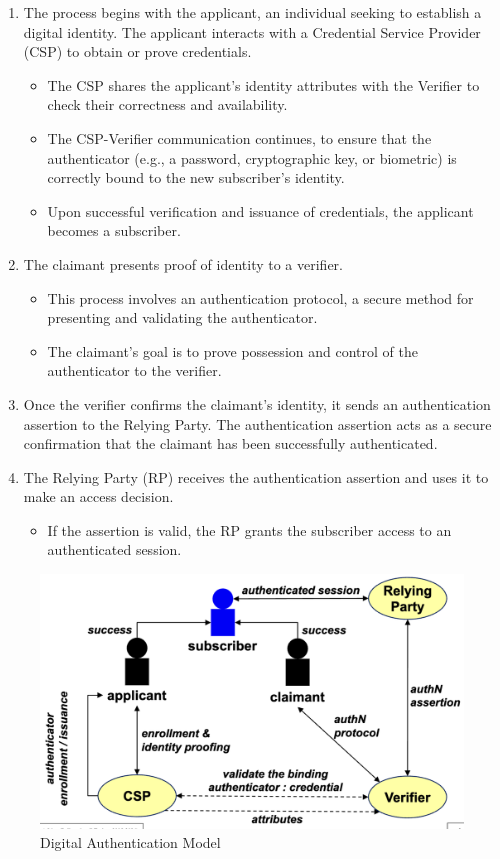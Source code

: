 \begin{enumerate}
    \item The process begins with the applicant, an individual seeking to establish a digital identity. The applicant interacts with a Credential Service Provider (CSP) to obtain or prove credentials.
\begin{itemize}
\item The CSP shares the applicant’s identity attributes with the Verifier to check their correctness and availability.
\item The CSP-Verifier communication continues, to ensure that the authenticator (e.g., a password, cryptographic key, or biometric) is correctly bound to the new subscriber’s identity.
\item Upon successful verification and issuance of credentials, the applicant becomes a subscriber.
\end{itemize}
    \item The claimant presents proof of identity to a verifier.
        \begin{itemize}
        \item This process involves an authentication protocol, a secure method for presenting and validating the authenticator.
        \item The claimant’s goal is to prove possession and control of the authenticator to the verifier.
        \end{itemize}
    \item Once the verifier confirms the claimant’s identity, it sends an authentication assertion to the Relying Party. The authentication assertion acts as a secure confirmation that the claimant has been successfully authenticated.
    \item The Relying Party (RP) receives the authentication assertion and uses it to make an access decision.
    \begin{itemize}
        \item If the assertion is valid, the RP grants the subscriber access to an authenticated session.
    \end{itemize}
\end{enumerate}

\begin{figure}[H]
    \centering
    \includegraphics[width=0.6\linewidth]{Images/Authentication/auth_model.png}
    \caption{Digital Authentication Model}
\end{figure}

